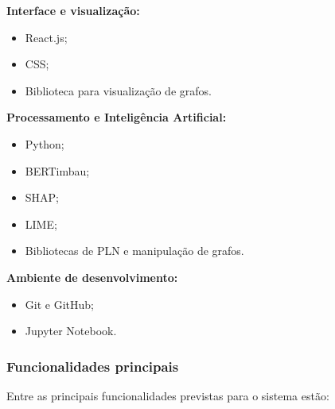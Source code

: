 \documentclass[
    12pt,                %
    openright,           %
    oneside,             %
    a4paper,             %
    english,             %
    brazil               %
]{abntex2}
\begin{document}
\textbf{Interface e visualização:}

\begin{itemize}
    \item React.js; 
    \item CSS;
    \item Biblioteca para visualização de grafos.
\end{itemize}

\textbf{Processamento e Inteligência Artificial:}

\begin{itemize}
    \item Python;
    \item BERTimbau;
    \item SHAP;
    \item LIME;
    \item Bibliotecas de PLN e manipulação de grafos.
\end{itemize}

\textbf{Ambiente de desenvolvimento:}

\begin{itemize}
    \item Git e GitHub;
    \item Jupyter Notebook.
\end{itemize}

\subsubsection{Funcionalidades principais}

Entre as principais funcionalidades previstas para o sistema estão:
%
\end{document}
